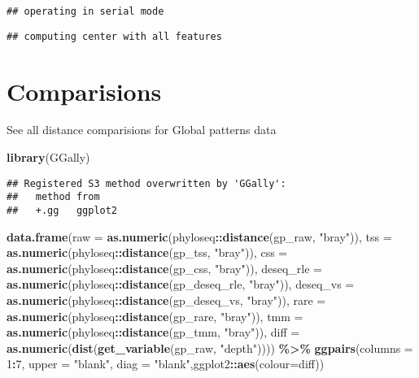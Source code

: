 \documentclass[
]{book}
\newenvironment{Shaded}{\begin{snugshade}}{\end{snugshade}}
\newcommand{\DataTypeTok}[1]{\textcolor[rgb]{0.13,0.29,0.53}{#1}}
\newcommand{\DecValTok}[1]{\textcolor[rgb]{0.00,0.00,0.81}{#1}}
\newcommand{\KeywordTok}[1]{\textcolor[rgb]{0.13,0.29,0.53}{\textbf{#1}}}
\newcommand{\NormalTok}[1]{#1}
\newcommand{\OperatorTok}[1]{\textcolor[rgb]{0.81,0.36,0.00}{\textbf{#1}}}
\newcommand{\StringTok}[1]{\textcolor[rgb]{0.31,0.60,0.02}{#1}}
\begin{document}
\begin{verbatim}
## operating in serial mode
\end{verbatim}

\begin{verbatim}
## computing center with all features
\end{verbatim}

\hypertarget{comparisions}{%
\chapter{Comparisions}\label{comparisions}}

See all distance comparisions for Global patterns data

\begin{Shaded}
\begin{Highlighting}[]
\KeywordTok{library}\NormalTok{(GGally)}
\end{Highlighting}
\end{Shaded}

\begin{verbatim}
## Registered S3 method overwritten by 'GGally':
##   method from   
##   +.gg   ggplot2
\end{verbatim}

\begin{Shaded}
\begin{Highlighting}[]
\KeywordTok{data.frame}\NormalTok{(}\DataTypeTok{raw =} \KeywordTok{as.numeric}\NormalTok{(phyloseq}\OperatorTok{::}\KeywordTok{distance}\NormalTok{(gp\_raw, }\StringTok{"bray"}\NormalTok{)), }
           \DataTypeTok{tss =} \KeywordTok{as.numeric}\NormalTok{(phyloseq}\OperatorTok{::}\KeywordTok{distance}\NormalTok{(gp\_tss, }\StringTok{"bray"}\NormalTok{)), }
           \DataTypeTok{css =} \KeywordTok{as.numeric}\NormalTok{(phyloseq}\OperatorTok{::}\KeywordTok{distance}\NormalTok{(gp\_css, }\StringTok{"bray"}\NormalTok{)),}
           \DataTypeTok{deseq\_rle =} \KeywordTok{as.numeric}\NormalTok{(phyloseq}\OperatorTok{::}\KeywordTok{distance}\NormalTok{(gp\_deseq\_rle, }\StringTok{"bray"}\NormalTok{)),}
           \DataTypeTok{deseq\_vs =} \KeywordTok{as.numeric}\NormalTok{(phyloseq}\OperatorTok{::}\KeywordTok{distance}\NormalTok{(gp\_deseq\_vs, }\StringTok{"bray"}\NormalTok{)),}
           \DataTypeTok{rare =} \KeywordTok{as.numeric}\NormalTok{(phyloseq}\OperatorTok{::}\KeywordTok{distance}\NormalTok{(gp\_rare, }\StringTok{"bray"}\NormalTok{)),}
           \DataTypeTok{tmm =} \KeywordTok{as.numeric}\NormalTok{(phyloseq}\OperatorTok{::}\KeywordTok{distance}\NormalTok{(gp\_tmm, }\StringTok{"bray"}\NormalTok{)),}
           \DataTypeTok{diff =} \KeywordTok{as.numeric}\NormalTok{(}\KeywordTok{dist}\NormalTok{(}\KeywordTok{get\_variable}\NormalTok{(gp\_raw, }\StringTok{"depth"}\NormalTok{)))) }\OperatorTok{\%\textgreater{}\%}\StringTok{ }
\StringTok{    }\KeywordTok{ggpairs}\NormalTok{(}\DataTypeTok{columns =} \DecValTok{1}\OperatorTok{:}\DecValTok{7}\NormalTok{, }\DataTypeTok{upper =} \StringTok{"blank"}\NormalTok{,}
            \DataTypeTok{diag =} \StringTok{"blank"}\NormalTok{,ggplot2}\OperatorTok{::}\KeywordTok{aes}\NormalTok{(}\DataTypeTok{colour=}\NormalTok{diff))}
\end{Highlighting}
\end{Shaded}
\end{document}
